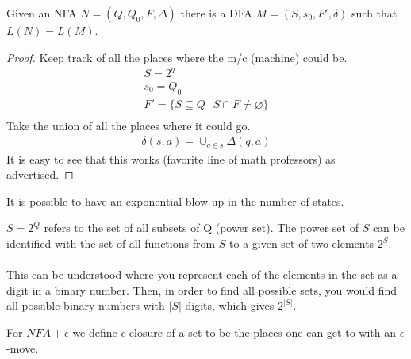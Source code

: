 \documentclass[class=scrartcl, crop=false]{standalone}
\begin{document}
\begin{theorem}
  Given an NFA $N = (Q, Q_0, F, \Delta)$ there is a DFA $M = (S, s_0, F', \delta)$
  such that $L(N) = L(M)$.
  \begin{proof}
    Keep track of all the places where the m/c (machine) could be.
    \begin{gather*}
      S = 2^q \\
      s_0 = Q_0 \\
      F' = \{S \subseteq Q \ | \ S \cap F \neq \varnothing\} \\
    \end{gather*}
    Take the union of all the places where it could go. %
    \begin{gather*}
      \delta(s, a) = \cup_{q \in s} \Delta(q, a)
    \end{gather*}
    It is easy to see that this works (favorite line of math professors) as
    advertised.
  \end{proof}
  \begin{remark}
    It is possible to have an exponential blow up in the number of states.
  \end{remark}
\end{theorem}
\begin{note}
  $S = 2^Q$ refers to the set of all subsets of Q (power set). The power set of $S$ can be identified with the set of all functions from $S$ to a given set of two elements $2^S$. \\\\
  This can be understood where you represent each of the elements in the set as
  a digit in a binary number. Then, in order to find all possible sets, you
  would find all possible binary numbers with $|S|$ digits, which gives
  $2^{|S|}$.
\end{note}

For $NFA + \epsilon$ we define $\epsilon$-closure of a set to be the places one
can get to with an $\epsilon$-move. %
\end{document}
